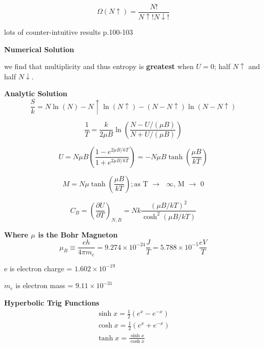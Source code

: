 \begin{equation}
    \Omega (N\uparrow) = \frac{N!}{N\uparrow!N\downarrow!}
\end{equation}

\begin{note}
lots of counter-intuitive results p.100-103
\end{note}

\textbf{Numerical Solution}

we find that multiplicity and thus entropy is \textbf{greatest} when $U = 0$; half $N\uparrow $ and half $N\downarrow$.

\textbf{Analytic Solution}
\begin{equation}
    \frac{S}{k} = N\ln(N) - N\uparrow \ln(N\uparrow) - (N-N\uparrow)\ln(N-N\uparrow)
\end{equation}

\begin{equation}
\frac{1}{T} = \frac{k}{2\mu B}\ln\left(\frac{N-U/(\mu B)}{N+U/(\mu B)}\right)  
\end{equation}

\begin{equation}
    U = N \mu B \left( \frac{1-e^{2\mu B/kT}}{1+e^{2\mu B/kT}}\right) = -N\mu B \tanh{\left(\frac{\mu B}{kT}\right)}
\end{equation}

\begin{equation}
    M = N \mu \tanh{\left(\frac{\mu B}{kT}\right)} ; \text{as T $\rightarrow$ $\infty$, M $\rightarrow$ 0}
\end{equation}


\begin{equation}
    C_B = \left(\frac{\partial U}{\partial T}\right)_{N, B} = Nk \frac{(\mu B/kT)^2}{\cosh^2{(\mu B/kT)}}
\end{equation}

\textbf{Where $\mu$ is the Bohr Magneton}
\[\mu_B \equiv \frac{eh}{4\pi m_e} = 9.274 \times 10^{-24} \frac{J}{T} = 5.788 \times 10^{-5} \frac{eV}{T}\]

e is electron charge = $1.602 \times 10^{-19}$

$m_e$ is electron mass = $9.11 \times 10^{-31}$


\textbf{Hyperbolic Trig Functions}
\begin{equation*}
\begin{split}
   \sinh{x} = \frac{1}{2}(e^x - e^{-x})\\
   \cosh{x} = \frac{1}{2}(e^x + e^{-x})\\
   \tanh{x} = \frac{\sinh{x}}{\cosh{x}}
\end{split}
\end{equation*}

